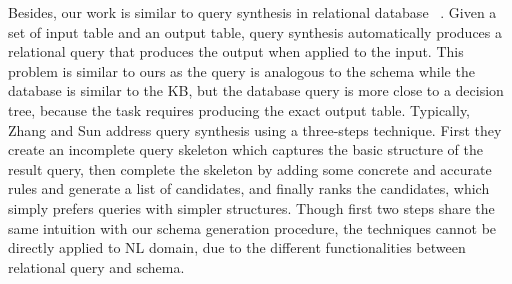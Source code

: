 Besides, our work is similar to query synthesis in relational database~
\cite{niehren2013query,das2010synthesizing,cheung2012inferring,cheung2013optimizing}. 
Given a set of input table and an output table,
query synthesis automatically produces a relational query that produces the output when applied to the input. 
This problem is similar to ours as the query is analogous to the schema
while the database is similar to the KB, but the database query is
more close to a decision tree, because the task requires producing the exact output table.
Typically, Zhang and Sun  
address query synthesis using a three-steps technique.
First they create an incomplete query skeleton which captures the basic structure of the result query,
then complete the skeleton by adding some concrete and accurate rules and generate a list of candidates,
and finally ranks the candidates, which simply prefers queries with simpler structures.
Though first two steps share the same intuition with our schema generation procedure,
the techniques cannot be directly applied to NL domain,
due to the different functionalities between relational query and schema.


